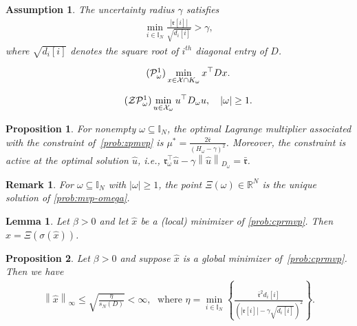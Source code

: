 \documentclass[10pt,a4paper]{amsart}
\newtheorem{assumption}{Assumption}
\newtheorem{proposition}{Proposition}
\newtheorem{remark}{Remark}
\newtheorem{lemma}{Lemma}
\newcommand{\II}{{\mathbb I}}
\newcommand{\RR}{{\mathbb R}} %
\newcommand{\abs}[1]{\left\lvert#1\right\rvert}
\newcommand{\cP}{{\mathcal P}}
\newcommand{\cX}{{\mathcal X}}
\newcommand{\cZ}{{\mathcal Z}}
\newcommand{\ccr}{{\mathfrak r}}
\newcommand{\norm}[1]{\left\lVert#1\right\rVert}
\newcommand{\tpose}[1]{#1^{\top}}
\begin{document}
\begin{assumption}\label{assump:feas}
The uncertainty radius $\gamma$ satisfies
\begin{align*}
\min_{i\in\II_N}\frac{\abs{\ccr[i]}}{\sqrt{d_i[i]}}>\gamma,
\end{align*}
where $\sqrt{d_i[i]}$ denotes the square root of $i^{th}$ diagonal entry of $D$.
\end{assumption}

\begin{align}\tag{$\cP^1_\omega$}\label{prob:mvp-omega}
	\min_{x\in \cX\cap K_\omega}\tpose{x}Dx.
\end{align}

\begin{align}\tag{$\cZ\cP^1_\omega$}\label{prob:zpmvp}
	\min_{u\in \cX_\omega}\tpose{u}D_\omega u, \quad \abs{\omega}\geq 1.
\end{align}

\begin{proposition}\label{prop:dual_solution}
For nonempty $\omega\subseteq \II_N$, the optimal Lagrange multiplier associated with the constraint of~\eqref{prob:zpmvp} is $\mu^* = \frac{2\bar{\ccr}}{(H_\omega - \gamma)^2}$.
Moreover, the constraint is active at the optimal solution $\hat u$, \textit{i.e.}, $\tpose{\ccr_\omega}\hat{u}-\gamma \norm{\hat{u}}_{D_\omega}= \bar{\ccr}$.
\end{proposition}

\begin{remark}
\label{rem:unique}
For $\omega\subseteq\II_N$ with $\abs{\omega}\geq 1$, the point $\Xi(\omega)\in\RR^N$ is the unique solution of \eqref{prob:mvp-omega}.
\end{remark}

\begin{lemma}\label{lemma8}
Let $\beta>0$ and let $\hat{x}$ be a (local) minimizer of \eqref{prob:cprmvp}. Then $\hat{x}=\Xi(\sigma(\hat{x}))$.
\end{lemma}

\begin{proposition}\label{prop:globup}
   Let $\beta>0$ and suppose $\hat{x}$ is a global minimizer of~\eqref{prob:cprmvp}. Then we have
    \begin{align*}
        \norm{\hat{x}}_\infty\leq \sqrt{\frac{\eta}{s_N(D)}}<\infty,  \;  \text{ where } \eta=\min_{i\in\II_N}\left\{\frac{\bar{\ccr}^2d_i[i]}{\left(|\ccr[i]|-\gamma\sqrt{d_i[i]}\right)^2}\right\}.\end{align*}
\end{proposition}
\end{document}

